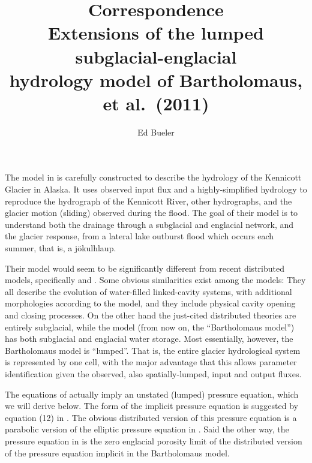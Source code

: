 \documentclass[twocolumn,letterpaper]{igs}
\begin{document}
\title[Extensions of the Bartholomaus hydrology model]{Correspondence \\ Extensions of the lumped subglacial-englacial \\ hydrology model of Bartholomaus, et al.~(2011)}

\author{Ed Bueler}


\maketitle

The model in \cite{Bartholomausetal2011} is carefully constructed to describe the hydrology of the Kennicott Glacier in Alaska.  It uses observed input flux and a highly-simplified hydrology to reproduce the hydrograph of the Kennicott River, other hydrographs, and the glacier motion (sliding) observed during the flood.  The goal of their model is to understand both the drainage through a subglacial and englacial network, and the glacier response, from a lateral lake outburst flood which occurs each summer, that is, a j\"okulhlaup.

Their model would seem to be significantly different from recent distributed models, specifically \cite{Schoofetal2012} and \cite{Hewittetal2012}.  Some obvious similarities exist among the models: They all describe the evolution of water-filled linked-cavity systems, with additional morphologies according to the model, and they include physical cavity opening and closing processes.  On the other hand the just-cited distributed theories are entirely subglacial, while the \cite{Bartholomausetal2011} model (from now on, the ``Bartholomaus model'') has both subglacial and englacial water storage.  Most essentially, however, the Bartholomaus model is ``lumped''.  That is, the entire glacier hydrological system is represented by one cell, with the major advantage that this allows parameter identification given the observed, also spatially-lumped, input and output fluxes.

The equations of \cite{Bartholomausetal2011} actually imply an unstated (lumped) pressure equation, which we will derive below.  The form of the implicit pressure equation is suggested by equation (12) in \cite{Bartholomausetal2011}.  The obvious distributed version of this pressure equation is a parabolic version of the elliptic pressure equation in \cite{Schoofetal2012}.  Said the other way, the pressure equation in \cite{Schoofetal2012} is the zero englacial porosity limit of the distributed version of the pressure equation implicit in the Bartholomaus model.
\end{document}
